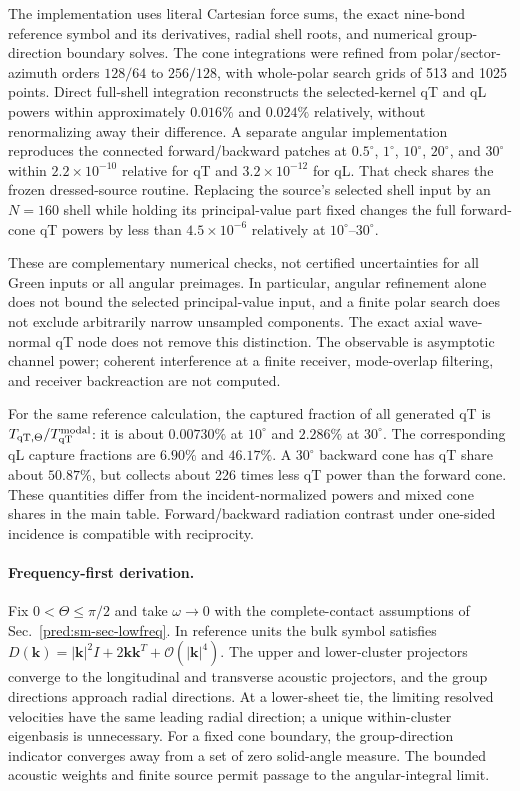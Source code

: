 \documentclass[10pt,aps,onecolumn,notitlepage,nofootinbib]{revtex4-2}
\newcommand{\vk}{\bm k}
\newcommand{\qT}{\mathrm{qT}}
\newcommand{\order}{\mathcal O}
\begin{document}
The implementation uses literal Cartesian force sums, the exact nine-bond reference symbol and its derivatives, radial shell roots, and numerical group-direction boundary solves. The cone integrations were refined from polar/sector-azimuth orders $128/64$ to $256/128$, with whole-polar search grids of 513 and 1025 points. Direct full-shell integration reconstructs the selected-kernel qT and qL powers within approximately $0.016\%$ and $0.024\%$ relatively, without renormalizing away their difference. A separate angular implementation reproduces the connected forward/backward patches at $0.5^\circ$, $1^\circ$, $10^\circ$, $20^\circ$, and $30^\circ$ within $2.2\times10^{-10}$ relative for qT and $3.2\times10^{-12}$ for qL. That check shares the frozen dressed-source routine. Replacing the source's selected shell input by an $N=160$ shell while holding its principal-value part fixed changes the full forward-cone qT powers by less than $4.5\times10^{-6}$ relatively at $10^\circ$--$30^\circ$.

These are complementary numerical checks, not certified uncertainties for all Green inputs or all angular preimages. In particular, angular refinement alone does not bound the selected principal-value input, and a finite polar search does not exclude arbitrarily narrow unsampled components. The exact axial wave-normal qT node does not remove this distinction. The observable is asymptotic channel power; coherent interference at a finite receiver, mode-overlap filtering, and receiver backreaction are not computed.

For the same reference calculation, the captured fraction of all generated qT is $T_{\qT,\Theta}/T_{\qT}^{\rm modal}$: it is about $0.00730\%$ at $10^\circ$ and $2.286\%$ at $30^\circ$. The corresponding qL capture fractions are $6.90\%$ and $46.17\%$. A $30^\circ$ backward cone has qT share about $50.87\%$, but collects about 226 times less qT power than the forward cone. These quantities differ from the incident-normalized powers and mixed cone shares in the main table. Forward/backward radiation contrast under one-sided incidence is compatible with reciprocity.

\paragraph*{Frequency-first derivation.}
Fix $0<\Theta\leq\pi/2$ and take $\omega\to0$ with the complete-contact assumptions of Sec.~\ref{pred:sm-sec-lowfreq}. In reference units the bulk symbol satisfies $D(\vk)=|\vk|^2I+2\vk\vk^T+\order(|\vk|^4)$. The upper and lower-cluster projectors converge to the longitudinal and transverse acoustic projectors, and the group directions approach radial directions. At a lower-sheet tie, the limiting resolved velocities have the same leading radial direction; a unique within-cluster eigenbasis is unnecessary. For a fixed cone boundary, the group-direction indicator converges away from a set of zero solid-angle measure. The bounded acoustic weights and finite source permit passage to the angular-integral limit.
\end{document}
